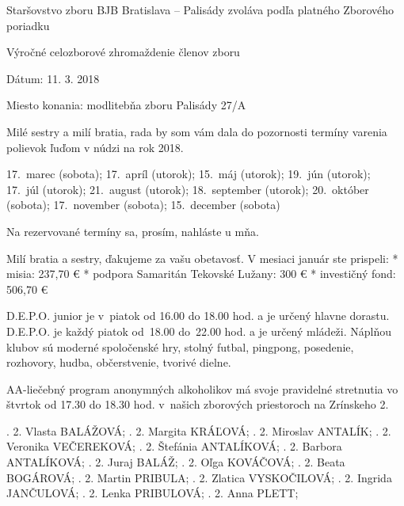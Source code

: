 

Staršovstvo zboru BJB Bratislava – Palisády zvoláva podľa platného Zborového poriadku

Výročné celozborové zhromaždenie členov zboru

Dátum: 11. 3. 2018

Miesto konania: modlitebňa zboru Palisády 27/A


Milé sestry a milí bratia, rada by som vám dala do pozornosti termíny varenia polievok ľuďom v núdzi na rok 2018.

17.~marec (sobota); 17.~apríl (utorok); 15.~máj (utorok); 19.~jún (utorok); 17.~júl (utorok); 21.~august (utorok); 18.~september (utorok); 20.~október (sobota); 17.~november (sobota); 15.~december (sobota)

Na rezervované termíny sa, prosím, nahláste u mňa.


Milí bratia a sestry, ďakujeme za vašu obetavosť. V mesiaci január ste prispeli:
\begitems
* misia: 237,70 €
* podpora Samaritán Tekovské Lužany: 300 €
* investičný fond: 506,70 €
\enditems

D.E.P.O. junior je v~piatok od 16.00 do 18.00 hod. a je určený hlavne dorastu. D.E.P.O. je každý piatok od~18.00 do~22.00 hod. a je určený mládeži. Náplňou klubov sú moderné spoločenské hry, stolný futbal, pingpong, posedenie, rozhovory, hudba, občerstvenie, tvorivé dielne.

AA-liečebný program anonymných alkoholikov má svoje pravidelné stretnutia vo štvrtok od 17.30 do 18.30 hod. v~našich zborových priestoroch na Zrínskeho 2.



.	2.	Vlasta	BALÁŽOVÁ;
.	2.	Margita	KRÁĽOVÁ;
.	2.	Miroslav	ANTALÍK;
.	2.	Veronika	VEČEREKOVÁ;
.	2.	Štefánia	ANTALÍKOVÁ;
.	2.	Barbora	ANTALÍKOVÁ;
.	2.	Juraj	BALÁŽ;
.	2.	Oľga	KOVÁČOVÁ;
.	2.	Beata	BOGÁROVÁ;
. 2.	Martin	PRIBULA;
. 2.	Zlatica	VYSKOČILOVÁ;
.	2.	Ingrida	JANČULOVÁ;
. 2.	Lenka	PRIBULOVÁ;
.	2.	Anna	PLETT;
\narodeniny

